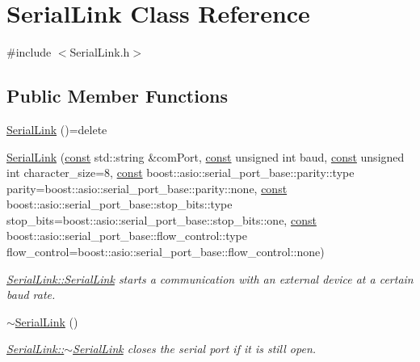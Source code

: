 \hypertarget{class_serial_link}{}\section{Serial\+Link Class Reference}
\label{class_serial_link}


{\ttfamily \#include $<$Serial\+Link.\+h$>$}

\subsection*{Public Member Functions}
\begin{DoxyCompactItemize}
\item 
\hyperlink{class_serial_link_a8789d0d7102d78c83a3c76e2b1a8e1e9}{Serial\+Link} ()=delete
\item 
\hyperlink{class_serial_link_a96aca1c125f24688b57b6fde3fbc4f6d}{Serial\+Link} (\hyperlink{functions__c_8js_afacfd9c985d225bb07483b887a801b6f}{const} std\+::string \&com\+Port, \hyperlink{functions__c_8js_afacfd9c985d225bb07483b887a801b6f}{const} unsigned int baud, \hyperlink{functions__c_8js_afacfd9c985d225bb07483b887a801b6f}{const} unsigned int character\+\_\+size=8, \hyperlink{functions__c_8js_afacfd9c985d225bb07483b887a801b6f}{const} boost\+::asio\+::serial\+\_\+port\+\_\+base\+::parity\+::type parity=boost\+::asio\+::serial\+\_\+port\+\_\+base\+::parity\+::none, \hyperlink{functions__c_8js_afacfd9c985d225bb07483b887a801b6f}{const} boost\+::asio\+::serial\+\_\+port\+\_\+base\+::stop\+\_\+bits\+::type stop\+\_\+bits=boost\+::asio\+::serial\+\_\+port\+\_\+base\+::stop\+\_\+bits\+::one, \hyperlink{functions__c_8js_afacfd9c985d225bb07483b887a801b6f}{const} boost\+::asio\+::serial\+\_\+port\+\_\+base\+::flow\+\_\+control\+::type flow\+\_\+control=boost\+::asio\+::serial\+\_\+port\+\_\+base\+::flow\+\_\+control\+::none)
\begin{DoxyCompactList}\small\item\em \hyperlink{class_serial_link_a8789d0d7102d78c83a3c76e2b1a8e1e9}{Serial\+Link\+::\+Serial\+Link} starts a communication with an external device at a certain baud rate. \end{DoxyCompactList}\item 
\hyperlink{class_serial_link_af9a3c0d7518e7f554f49c198411e1521}{$\sim$\+Serial\+Link} ()
\begin{DoxyCompactList}\small\item\em \hyperlink{class_serial_link_af9a3c0d7518e7f554f49c198411e1521}{Serial\+Link\+::$\sim$\+Serial\+Link} closes the serial port if it is still open. \end{DoxyCompactList}\item 

\end{DoxyCompactItemize}
